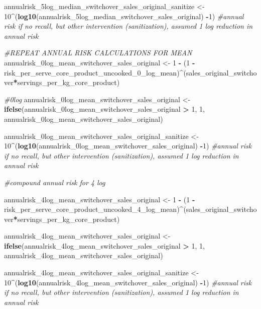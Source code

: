 \documentclass[
]{article}
\newenvironment{Shaded}{\begin{snugshade}}{\end{snugshade}}
\newcommand{\CommentTok}[1]{\textcolor[rgb]{0.56,0.35,0.01}{\textit{#1}}}
\newcommand{\DecValTok}[1]{\textcolor[rgb]{0.00,0.00,0.81}{#1}}
\newcommand{\FunctionTok}[1]{\textcolor[rgb]{0.13,0.29,0.53}{\textbf{#1}}}
\newcommand{\NormalTok}[1]{#1}
\newcommand{\OtherTok}[1]{\textcolor[rgb]{0.56,0.35,0.01}{#1}}
\newcommand{\SpecialCharTok}[1]{\textcolor[rgb]{0.81,0.36,0.00}{\textbf{#1}}}
\begin{document}
\begin{Shaded}
\begin{Highlighting}[]
\NormalTok{annualrisk\_5log\_median\_switchover\_sales\_original\_sanitize }\OtherTok{\textless{}{-}} \DecValTok{10}\SpecialCharTok{\^{}}\NormalTok{(}\FunctionTok{log10}\NormalTok{(annualrisk\_5log\_median\_switchover\_sales\_original) }\SpecialCharTok{{-}}\DecValTok{1}\NormalTok{) }\CommentTok{\#annual risk if no recall, but other intervention (sanitization), assumed 1 log reduction in annual risk}

\CommentTok{\#REPEAT ANNUAL RISK CALCULATIONS FOR MEAN}
\NormalTok{annualrisk\_0log\_mean\_switchover\_sales\_original }\OtherTok{\textless{}{-}} \DecValTok{1} \SpecialCharTok{{-}}\NormalTok{ (}\DecValTok{1} \SpecialCharTok{{-}}\NormalTok{ risk\_per\_serve\_core\_product\_uncooked\_0\_log\_mean)}\SpecialCharTok{\^{}}\NormalTok{(sales\_original\_switchover}\SpecialCharTok{*}\NormalTok{servings\_per\_kg\_core\_product)}

\CommentTok{\#0log}
\NormalTok{annualrisk\_0log\_mean\_switchover\_sales\_original }\OtherTok{\textless{}{-}} \FunctionTok{ifelse}\NormalTok{(annualrisk\_0log\_mean\_switchover\_sales\_original }\SpecialCharTok{\textgreater{}} \DecValTok{1}\NormalTok{, }\DecValTok{1}\NormalTok{, annualrisk\_0log\_mean\_switchover\_sales\_original)}

\NormalTok{annualrisk\_0log\_mean\_switchover\_sales\_original\_sanitize }\OtherTok{\textless{}{-}} \DecValTok{10}\SpecialCharTok{\^{}}\NormalTok{(}\FunctionTok{log10}\NormalTok{(annualrisk\_0log\_mean\_switchover\_sales\_original) }\SpecialCharTok{{-}}\DecValTok{1}\NormalTok{) }\CommentTok{\#annual risk if no recall, but other intervention (sanitization), assumed 1 log reduction in annual risk}

\CommentTok{\#compound annual risk for 4 log}

\NormalTok{annualrisk\_4log\_mean\_switchover\_sales\_original }\OtherTok{\textless{}{-}} \DecValTok{1} \SpecialCharTok{{-}}\NormalTok{ (}\DecValTok{1} \SpecialCharTok{{-}}\NormalTok{ risk\_per\_serve\_core\_product\_uncooked\_4\_log\_mean)}\SpecialCharTok{\^{}}\NormalTok{(sales\_original\_switchover}\SpecialCharTok{*}\NormalTok{servings\_per\_kg\_core\_product)}

\NormalTok{annualrisk\_4log\_mean\_switchover\_sales\_original }\OtherTok{\textless{}{-}} \FunctionTok{ifelse}\NormalTok{(annualrisk\_4log\_mean\_switchover\_sales\_original }\SpecialCharTok{\textgreater{}} \DecValTok{1}\NormalTok{, }\DecValTok{1}\NormalTok{, annualrisk\_4log\_mean\_switchover\_sales\_original)}

\NormalTok{annualrisk\_4log\_mean\_switchover\_sales\_original\_sanitize }\OtherTok{\textless{}{-}} \DecValTok{10}\SpecialCharTok{\^{}}\NormalTok{(}\FunctionTok{log10}\NormalTok{(annualrisk\_4log\_mean\_switchover\_sales\_original) }\SpecialCharTok{{-}}\DecValTok{1}\NormalTok{) }\CommentTok{\#annual risk if no recall, but other intervention (sanitization), assumed 1 log reduction in annual risk}


\end{Highlighting}
\end{Shaded}
\end{document}
